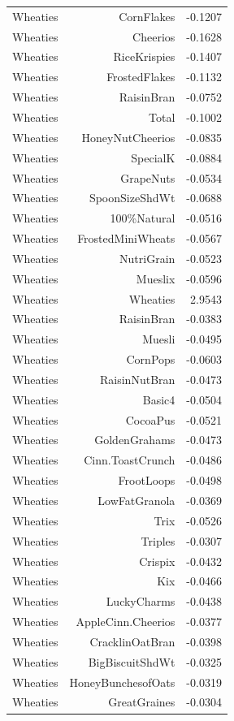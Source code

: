 \begin{longtable}{@{}lrr@{}}
Wheaties & CornFlakes & -0.1207 \\
Wheaties & Cheerios & -0.1628 \\
Wheaties & RiceKrispies & -0.1407 \\
Wheaties & FrostedFlakes & -0.1132 \\
Wheaties & RaisinBran & -0.0752 \\
Wheaties & Total & -0.1002 \\
Wheaties & HoneyNutCheerios & -0.0835 \\
Wheaties & SpecialK & -0.0884 \\
Wheaties & GrapeNuts & -0.0534 \\
Wheaties & SpoonSizeShdWt & -0.0688 \\
Wheaties & 100\%Natural & -0.0516 \\
Wheaties & FrostedMiniWheats & -0.0567 \\
Wheaties & NutriGrain & -0.0523 \\
Wheaties & Mueslix & -0.0596 \\
Wheaties & Wheaties & 2.9543 \\
Wheaties & RaisinBran & -0.0383 \\
Wheaties & Muesli & -0.0495 \\
Wheaties & CornPops & -0.0603 \\
Wheaties & RaisinNutBran & -0.0473 \\
Wheaties & Basic4 & -0.0504 \\
Wheaties & CocoaPus & -0.0521 \\
Wheaties & GoldenGrahams & -0.0473 \\
Wheaties & Cinn.ToastCrunch & -0.0486 \\
Wheaties & FrootLoops & -0.0498 \\
Wheaties & LowFatGranola & -0.0369 \\
Wheaties & Trix & -0.0526 \\
Wheaties & Triples & -0.0307 \\
Wheaties & Crispix & -0.0432 \\
Wheaties & Kix & -0.0466 \\
Wheaties & LuckyCharms & -0.0438 \\
Wheaties & AppleCinn.Cheerios & -0.0377 \\
Wheaties & CracklinOatBran & -0.0398 \\
Wheaties & BigBiscuitShdWt & -0.0325 \\
Wheaties & HoneyBunchesofOats & -0.0319 \\
Wheaties & GreatGraines & -0.0304 \\

\end{longtable}
